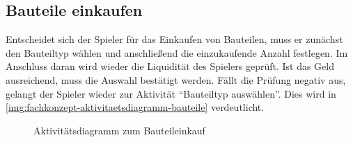 \subsection{Bauteile einkaufen}
\label{sec:fachkonzept-aktivitaetsdiagramm}

Entscheidet sich der Spieler für das Einkaufen von Bauteilen, muss er zunächst den Bauteiltyp wählen und anschließend die einzukaufende Anzahl festlegen. Im Anschluss daran wird wieder die Liquidität des Spielers geprüft. Ist das Geld ausreichend, muss die Auswahl bestätigt werden. Fällt die Prüfung negativ aus, gelangt der Spieler wieder zur Aktivität “Bauteiltyp auswählen”. Dies wird in \vref{img:fachkonzept-aktivitaetsdiagramm-bauteile} verdeutlicht.

\begin{figure}[h]
  \centering
  \caption{Aktivitätsdiagramm zum Bauteileinkauf}
  \label{img:fachkonzept-aktivitaetsdiagramm-bauteile}
\end{figure}